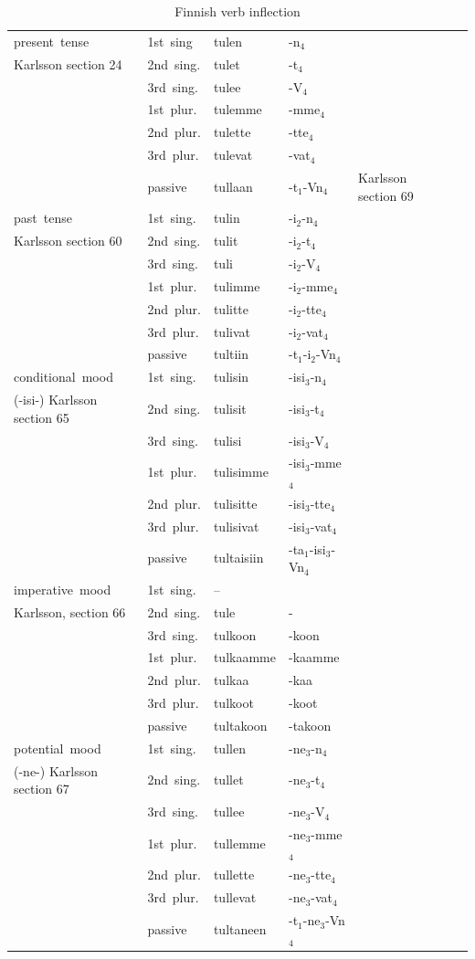 \documentclass[11pt,letterpaper]{article}
\begin{document}
\begin{table}
\begin{tabular}{lllllll}
	present tense & 	1st sing& 	tulen  & -n$_4$\\ 
Karlsson section 24	&	2nd sing. 	& 	tulet  & -t$_4$\\ 
	&	3rd sing. 	& 	tulee  & -V$_4$\\                
	&	1st plur. 	& 	tulemme  &-mme$_4$\\ 
	&	2nd plur. 	& 	tulette  &-tte$_4$\\ 
	&	3rd plur. 	& 	tulevat  &-vat$_4$\\ 
	&	passive 	& 	tullaan  &-t$_1$-Vn$_4$ & Karlsson section 69\\  \hline
past tense 	 	&	1st sing.& 	tulin & -i$_2$-n$_4$\\  
	Karlsson section 60&	2nd sing. &	tulit  & -i$_2$-t$_4$\\ 
	&	3rd sing. &	tuli  & -i$_2$-V$_4$\\ 
	&	1st plur. &	tulimme  &-i$_2$-mme$_4$\\ 
	&	2nd plur. &	tulitte  &-i$_2$-tte$_4$\\ 
	&3rd plur. &	tulivat  & -i$_2$-vat$_4$\\ 
	&	passive &	tultiin  &-t$_1$-i$_2$-Vn$_4$ \\  \hline
conditional mood  &1st sing. &	tulisin  & -isi$_3$-n$_4$\\ 
	(-isi-) Karlsson section 65	&2nd sing. &	tulisit  & -isi$_3$-t$_4$\\ 
	&3rd sing. &	tulisi  & -isi$_3$-V$_4$\\ 
	&1st plur. &	tulisimme  & -isi$_3$-mme$_4$\\ 
	&2nd plur. &	tulisitte  & -isi$_3$-tte$_4$\\ 
	&3rd plur. &	tulisivat  & -isi$_3$-vat$_4$ \\ 
	&passive &	tultaisiin  & -ta$_1$-isi$_3$-Vn$_4$\\  \hline
	imperative mood  &1st sing. &	-- \\ 
	 Karlsson, section 66	 & 2nd sing. &	tule & - \\ 
	&	3rd sing. &	tulkoon  & -koon\\ 
	&	1st plur. &	tulkaamme  & -kaamme\\ 
	&	2nd plur. &	tulkaa   & -kaa\\ 
	&	3rd plur. 	&tulkoot  & -koot\\ 
	&	passive 	&tultakoon  & -takoon\\ \hline
	potential mood 	 &	1st sing. &	tullen  & -ne$_3$-n$_4$\\ 
		(-ne-) Karlsson section 67 & 2nd sing. &	tullet  & -ne$_3$-t$_4$\\ 
	&	3rd sing. &	tullee  & -ne$_3$-V$_4$\\ 
	&	1st plur. &	tullemme  & -ne$_3$-mme$_4$\\ 
	&	2nd plur. &	tullette  & -ne$_3$-tte$_4$\\ 
	&	3rd plur. &	tullevat  & -ne$_3$-vat$_4$\\ 
	&	passive &	tultaneen  & -t$_1$-ne$_3$-Vn$_4$ \\ 
\end{tabular}
	\caption{Finnish verb inflection}
\end{table}
\end{document}
